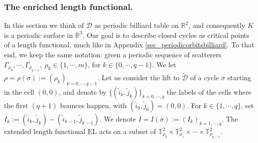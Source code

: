 \documentclass[reqno,11pt]{amsart}
\begin{document}
\subsubsection{The enriched length functional.}
\par In this section we think of \( \mathcal{D} \) as periodic billiard table on \( \mathbb{R}^2 \), and consequently \( K \) is a periodic surface in \( \mathbb{R}^3 \). 
Our goal is to describe closed cycles as critical points of a length functional, much like in Appendix \ref{sec_periodicorbitsbilliard}.
To that end, we keep the same notation:
given a periodic sequence of scatterers \( \Gamma_{\rho_0}, \cdots , \Gamma_{\rho_{q-1}}, \  \rho_k \in \{ 1,\cdots, m \} \), for \( k \in \{ 0,\cdots, q-1 \} \). 
We let \( \rho = \rho(\sigma):=(\rho_k)_{k=0,\cdots,q-1} \). 
Let us consider the lift to \( \widetilde{\mathcal{D}} \) of a cycle \( \sigma \) starting in the cell \( (0,0) \), and denote by  \( \{(\tilde i_k,\tilde j_k)\}_{k=0,\cdots,q} \) the labels of the cells where the first \( (q+1) \) bounces happen, with \( (\tilde i_0,\tilde j_0)=(0,0) \).
For \( k\in \{1,\cdots,q\} \), set \( I_k:=(\tilde i_k,\tilde j_k)-(\tilde i_{k-1},\tilde j_{k-1}) \). 
We denote \( I = I(\sigma):=(I_k)_{k=1,\cdots,q} \).
The extended length functional \( \mathrm{EL} \) acts on a subset of \( \mathbb{T}_{\rho_0}^2 \times \mathbb{T}_{\rho_1}^2 \times \cdots \times \mathbb{T}_{\rho_{q-1}}^2 \).
\end{document}
